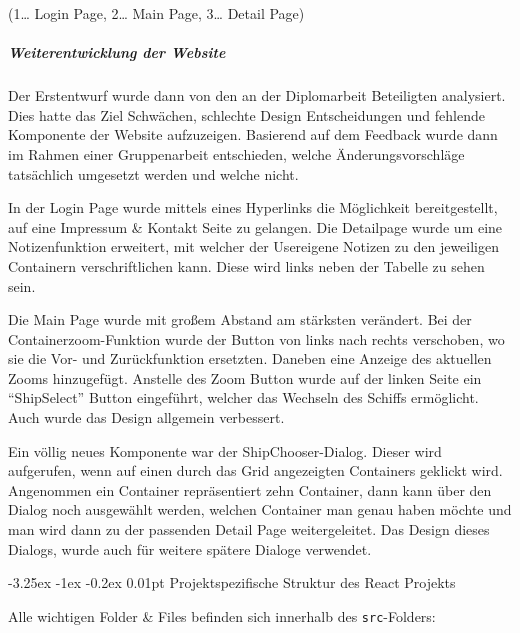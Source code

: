 \documentclass[
    headings=optiontotocandhead,%
    twoside,
    numbers=noenddot,%
    12pt, %
    titlepage, %
    parskip=full, %
    listof=leveldown, 
    numbers=noenddot, %
    a4paper,DIV=14,
    BCOR=15mm,
]{scrbook}
\makeatletter
\newcommand{\passthrough}[1]{#1}
\renewcommand\paragraph{\@startsection{paragraph}{4}{\z@}%
    {-3.25ex \@plus -1ex \@minus -0.2ex}%
    {0.01pt}%
    {\raggedsection\normalfont\sectfont\nobreak\size@paragraph}%
  }
\makeatother
\begin{document}
(1\ldots{} Login Page, 2\ldots{} Main Page, 3\ldots{} Detail Page)

\hypertarget{weiterentwicklung-der-website}{%
\subparagraph{Weiterentwicklung der
Website}\label{weiterentwicklung-der-website}}

Der Erstentwurf wurde dann von den an der Diplomarbeit Beteiligten
analysiert. Dies hatte das Ziel Schwächen, schlechte Design
Entscheidungen und fehlende Komponente der Website aufzuzeigen.
Basierend auf dem Feedback wurde dann im Rahmen einer Gruppenarbeit
entschieden, welche Änderungsvorschläge tatsächlich umgesetzt werden und
welche nicht.

In der Login Page wurde mittels eines Hyperlinks die Möglichkeit
bereitgestellt, auf eine Impressum \& Kontakt Seite zu gelangen. Die
Detailpage wurde um eine Notizenfunktion erweitert, mit welcher der
Usereigene Notizen zu den jeweiligen Containern verschriftlichen kann.
Diese wird links neben der Tabelle zu sehen sein.

Die Main Page wurde mit großem Abstand am stärksten verändert. Bei der
Containerzoom-Funktion wurde der Button von links nach rechts
verschoben, wo sie die Vor- und Zurückfunktion ersetzten. Daneben eine
Anzeige des aktuellen Zooms hinzugefügt. Anstelle des Zoom Button wurde
auf der linken Seite ein ``ShipSelect'' Button eingeführt, welcher das
Wechseln des Schiffs ermöglicht. Auch wurde das Design allgemein
verbessert.

Ein völlig neues Komponente war der ShipChooser-Dialog. Dieser wird
aufgerufen, wenn auf einen durch das Grid angezeigten Containers
geklickt wird. Angenommen ein Container repräsentiert zehn Container,
dann kann über den Dialog noch ausgewählt werden, welchen Container man
genau haben möchte und man wird dann zu der passenden Detail Page
weitergeleitet. Das Design dieses Dialogs, wurde auch für weitere
spätere Dialoge verwendet.

\hypertarget{projektspezifische-struktur-des-react-projekts}{%
\paragraph{Projektspezifische Struktur des React
Projekts}\label{projektspezifische-struktur-des-react-projekts}}

Alle wichtigen Folder \& Files befinden sich innerhalb des
\passthrough{\lstinline!src!}-Folders:
\end{document}
